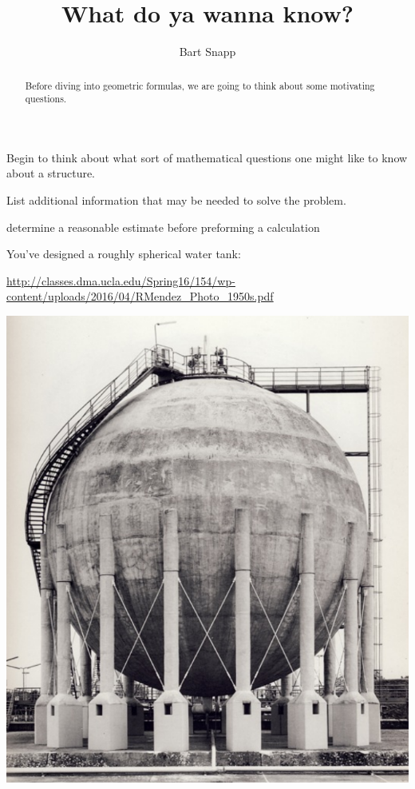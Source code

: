 \documentclass[handout,noauthor]{../ximera}
\title{What do ya wanna know?}
\author{Bart Snapp}
\begin{document}
\begin{abstract}
Before diving into geometric formulas, we are going to think about some motivating questions.
\end{abstract}
\maketitle


\begin{listOutcomes}
\item{Begin to think about what sort of mathematical questions one
  might like to know about a structure.}
\item{List additional information that may be needed to solve the
  problem.}
\end{listOutcomes}
 
\begin{listObjectives}
 \item{determine a reasonable estimate before preforming a calculation}
\end{listObjectives}
 
 
You've designed a roughly spherical water tank:
\begin{center}\url{http://classes.dma.ucla.edu/Spring16/154/wp-content/uploads/2016/04/RMendez_Photo_1950s.pdf}

  \includegraphics[width=.6\textwidth]{tank.png}
\end{center}

\mynewpage
\end{document}
